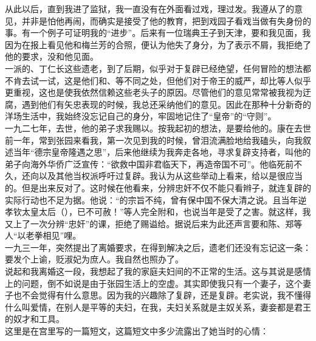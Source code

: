 从此以后，直到我进了监狱，我一直没有在外面看过戏，理过发。我遵从了的意见，并非是怕他再闹，而确实是接受了他的教育，把到戏园子看戏当做有失身份的事。有一个例子可证明我的“进步”。后来有一位瑞典王子到天津，要和我见面，我因为在报上看见他和梅兰芳的合照，便认为他失了身分，为了表示不屑，我拒绝了他的要求，没和他见面。\\

一派的、丁仁长这些遗老，到了后期，似乎对于复辟已经绝望，任何冒险的想法都不肯去试一试，这是他们和、等不同之处，但他们对于帝王的威严，却比等人似乎更重视，这也是使我依然信赖这些老头子的原因。尽管他们的意见常常被我视为迂腐，遇到他们有矢忠表现的时候，我总还采纳他们的意见。因此在那种十分新奇的洋场生活中，我始终没忘记自己的身分，牢固地记住了“皇帝”的“守则”。\\

一九二七年，去世，他的弟子求我赐以。按我起初的想法，是要给他的。康在去世前一年，常到张园来看我，第一次见到我的时候，曾泪流满脸地给我磕头，向我叙述当年“德宗皇帝隆遇之思”，后来他继续为我奔走各地，寻求复辟支持者，叫他的弟子向海外华侨广泛宣传：“欲救中国非君临天下，再造帝国不可”。他临死前不久，还向以及其他当权派呼吁过复辟。我认为从这些举动上看来，给以是很应当的。但是出来反对了。这时候在他看来，分辨忠奸不仅不能只看辫子，就连复辟的实际行动也不足为据。他说：“的宗旨不纯，曾有保中国不保大清之说。且当年逆孝钦太皇太后（），已不可赦！”等人完全附和，也说当年是受了之害。就这样，我又上了一次分辨“忠奸”的课，拒绝了赐谥给。据说后来为此还声言要和陈、郑等人“以老拳相见”哩。\\

一九三一年，突然提出了离婚要求，在得到解决之后，遗老们还没有忘记这一条：要发个上谕，贬淑妃为庶人。我自然也照办了。\\

说起和我离婚这一段，我想起了我的家庭夫妇间的不正常的生活。这与其说是感情上的问题，倒不如说是由于张园生活上的空虚。其实即使我只有一个妻子，这个妻子也不会觉得有什么意思。因为我的兴趣除了复辟，还是复辟。老实说，我不懂得什么叫爱情，在别人是平等的夫妇，在我，夫妇关系就是主奴关系，妻妾都是君王的奴才和工具。\\

这里是在宫里写的一篇短文，这篇短文中多少流露出了她当时的心情：\\

